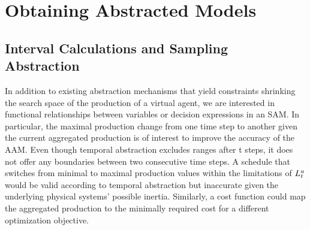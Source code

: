 \documentclass[conference]{IEEEtran}
\begin{document}


\section{Obtaining Abstracted Models}

\subsection{Interval Calculations and Sampling Abstraction}

In addition to existing abstraction mechanisms that yield constraints shrinking the search space of the production of a virtual agent, we are interested in functional relationships between variables or decision expressions in an SAM. In particular, the maximal production change from one time step to another given the current aggregated production is of interest to improve the accuracy of the AAM. Even though temporal abstraction excludes ranges after t steps, it does not offer any boundaries between two consecutive time steps. A schedule that switches from minimal to maximal production values within the limitations of $L_t^a$ would be valid according to temporal abstraction but inaccurate given the underlying physical systems' possible inertia. Similarly, a cost function could map the aggregated production to the minimally required cost for a different optimization objective. 
\end{document}
